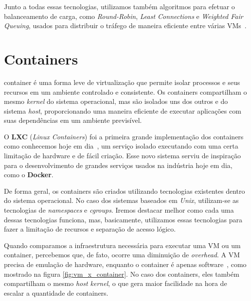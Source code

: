 Junto a todas essas tecnologias, utilizamos também algoritmos para efetuar o balanceamento de carga, como \textit{Round-Robin}, \textit{Least Connections} e \textit{Weighted Fair Queuing}, usados para distribuir o tráfego de maneira eficiente entre várias VMs~\citep{dong2012high}.


\section{Containers}

container é uma forma leve de virtualização que permite isolar processos e seus recursos em um ambiente controlado e consistente. Os containers compartilham o mesmo \textit{kernel} do sistema operacional, mas são isolados uns dos outros e do sistema \textit{host}, proporcionando uma maneira eficiente de executar aplicações com suas dependências em um ambiente previsível.

O \textbf{LXC} (\textit{Linux Containers}) foi a primeira grande implementação dos containers como conhecemos hoje em dia~\citep{HistoryOfCloudByIBM}, um serviço isolado executando com uma certa limitação de hardware e de fácil criação. Esse novo sistema serviu de inspiração para o desenvolvimento de grandes serviços usados na indústria hoje em dia, como o \textbf{Docker}.

De forma geral, os containers são criados utilizando tecnologias existentes dentro do sistema operacional. No caso dos sistemas baseados em \textit{Unix}, utilizam-se as tecnologias de \textit{namespaces} e \textit{cgroups}. Iremos destacar melhor como cada uma dessas tecnologias funciona, mas, basicamente, utilizamos essas tecnologias para fazer a limitação de recursos e separação de acesso lógico.

Quando comparamos a infraestrutura necessária para executar uma VM ou um container, percebemos que, de fato, ocorre uma diminuição de \textit{overhead}. A VM precisa de emulação de hardware, enquanto o container é apenas software~\citep{OCIContainer}, como mostrado na figura \ref{fig:vm_x_container}. No caso dos containers, eles também compartilham o mesmo \textit{host kernel}, o que gera maior facilidade na hora de escalar a quantidade de containers.


